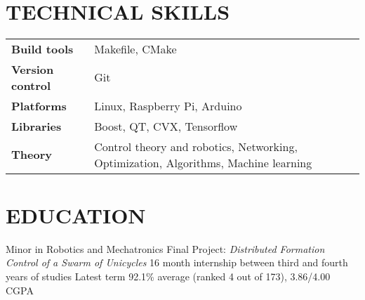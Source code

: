\documentclass{ResumeTemplate}
\begin{document}
	\fontsize{10}{12}\selectfont
	

	\centering{}
	~

	\raggedright\begin{minipage}[c]{0.65\linewidth} 

		
		\section{TECHNICAL SKILLS}
		
		\noindent\begin{tabularx}{\linewidth}{>{\bfseries}lX}
		   Build tools     & Makefile, CMake \\
		   Version control & Git \\
		   Platforms       & Linux, Raspberry Pi, Arduino \\
		   Libraries       & Boost, QT, CVX, Tensorflow \\
		   Theory          & Control theory and robotics, Networking, Optimization, Algorithms, Machine learning
		\end{tabularx}

		\section{EDUCATION}
		
		\workitemsfour
		{Minor in Robotics and Mechatronics}
		{Final Project: \textit{Distributed Formation Control of a Swarm of Unicycles}}
		{16 month internship between third and fourth years of studies}
		{Latest term 92.1\% average (ranked 4 out of 173), 3.86/4.00 CGPA}
	

\end{minipage}
\end{document}
